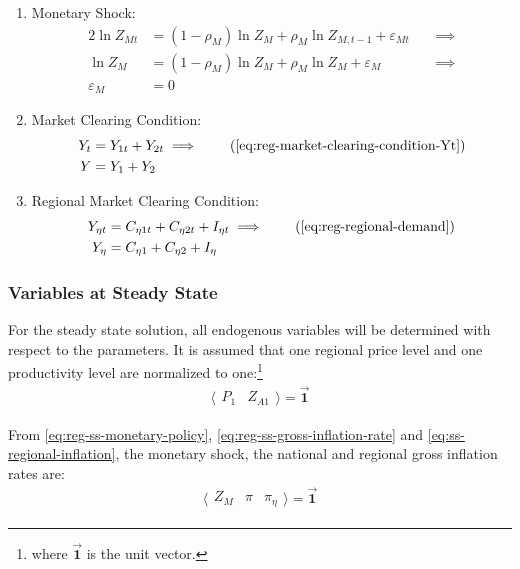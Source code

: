 \documentclass[
thesis.tex
]{subfiles}
\begin{document}
\begin{enumerate}
	\item Monetary Shock:
	\begin{alignat}{2}
		\ln{Z_{Mt}} &= (1-\rho_M)\ln{Z_{M}} + \rho_M\ln{Z_{M,t-1}} + \varepsilon_{Mt} \quad &\implies \nonumber \\
		\ln{Z_{M}} &= (1-\rho_M)\ln{Z_{M}} + \rho_M\ln{Z_{M}} + \varepsilon_{M} &\implies \nonumber \\
		\varepsilon_{M} &= 0 \label{eq:reg-ss-monetary-shock}
	\end{alignat}
	
	\item Market Clearing Condition:
	\begin{align}
		Y_{t} &= Y_{1 t} + Y_{2 t} \implies \tag{\ref{eq:reg-market-clearing-condition-Yt}} \\
		Y &= Y_{1} + Y_{2} \label{eq:reg-ss-market-clearing-condition}
	\end{align}
	
	\item Regional Market Clearing Condition:
	\begin{align}
		Y_{\eta t} &= C_{\eta 1 t} + C_{\eta 2 t} + I_{\eta t} \implies \tag{\ref{eq:reg-regional-demand}} \\
		Y_{\eta} &= C_{\eta 1} + C_{\eta 2} + I_{\eta} \label{eq:reg-ss-total-yn}
	\end{align}
	
\end{enumerate}


\subsubsection{Variables at Steady State}

	For the steady state solution, all endogenous variables will be determined with respect to the parameters. It is assumed that one regional price level and one productivity level are normalized to one:\footnote{where $\vec{\bm{1}}$ is the unit vector.}
	\begin{align}
		\langle \begin{matrix} P_{1} & Z_{A1} \end{matrix} \rangle = \vec{\bm{1}} \label{eq:reg-ss-p1-za1}
	\end{align}
	
	From \ref{eq:reg-ss-monetary-policy}, \ref{eq:reg-ss-gross-inflation-rate} and \ref{eq:ss-regional-inflation}, the monetary shock, the national and regional gross inflation rates are:
	\begin{align}
		\langle \begin{matrix} Z_{M} & \pi & \pi_{\eta} \end{matrix} \rangle  = \vec{\bm{1}}
	\end{align}
	
\end{document}
